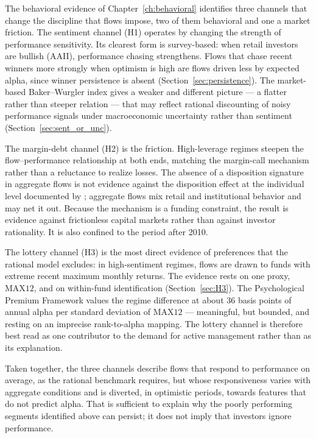 \documentclass[12pt, oneside]{report}
\begin{document}
The behavioral evidence of Chapter~\ref{ch:behavioral} identifies three
channels that change the discipline that flows impose, two of them
behavioral and one a market friction. The sentiment channel (H1)
operates by changing the strength of performance sensitivity. Its
clearest form is survey-based: when retail investors are bullish (AAII),
performance chasing strengthens. Flows that chase recent winners more
strongly when optimism is high are flows driven less by expected alpha,
since winner persistence is absent (Section~\ref{sec:persistence}). The
market-based Baker--Wurgler index gives a weaker and different picture
--- a flatter rather than steeper relation --- that may reflect rational
discounting of noisy performance signals under macroeconomic uncertainty
rather than sentiment (Section~\ref{sec:sent_or_unc}).

The margin-debt channel (H2) is the friction. High-leverage regimes
steepen the flow--performance relationship at both ends, matching the
\textcite{BrunnermeierPedersen2009} margin-call mechanism rather than a
reluctance to realize losses. The absence of a disposition signature in
aggregate flows is not evidence against the disposition effect at the
individual level documented by \textcite{Odean1998}; aggregate flows mix
retail and institutional behavior and may net it out. Because the
mechanism is a funding constraint, the result is evidence against
frictionless capital markets rather than against investor rationality.
It is also confined to the period after 2010.

The lottery channel (H3) is the most direct evidence of preferences that
the rational model excludes: in high-sentiment regimes, flows are drawn
to funds with extreme recent maximum monthly returns. The evidence rests
on one proxy, $\text{MAX12}$, and on within-fund identification
(Section~\ref{sec:H3}). The Psychological Premium Framework values the
regime difference at about 36 basis points of annual alpha per standard
deviation of $\text{MAX12}$ --- meaningful, but bounded, and resting on an
imprecise rank-to-alpha mapping. The lottery channel is therefore best
read as one contributor to the demand for active management rather than
as its explanation.

Taken together, the three channels describe flows that respond to
performance on average, as the rational benchmark requires, but whose
responsiveness varies with aggregate conditions and is diverted, in
optimistic periods, towards features that do not predict alpha. That is
sufficient to explain why the poorly performing segments identified above
can persist; it does not imply that investors ignore performance.
\end{document}
